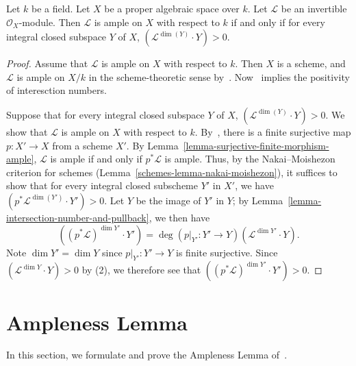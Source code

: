 \begin{lemma}
\label{spaces-lemma-nakai-moishezon}
Let $k$ be a field.
Let $X$ be a proper algebraic space over $k$.
Let $\mathcal{L}$ be an invertible $\mathcal{O}_X$-module.
Then $\mathcal{L}$ is ample on $X$ with respect to $k$ if and only if
for every integral closed subspace $Y$ of $X$,
$(\mathcal{L}^{\dim(Y)} \cdot Y) > 0$.
\end{lemma}
\begin{proof}
  Assume that $\mathcal{L}$ is ample on $X$ with respect to $k$.
  Then $X$ is a scheme, and $\mathcal{L}$ is ample on $X/k$ in the
  scheme-theoretic sense by~.
  Now~ implies the positivity of interesction numbers.

  Suppose that for every integral closed subspace $Y$ of $X$,
  $(\mathcal{L}^{\dim(Y)} \cdot Y) > 0$.
  We show that $\mathcal{L}$ is ample on $X$ with respect to $k$.
  By~, there is a finite surjective map $p : X' \to X$ from a
  scheme $X'$.
  By Lemma~\ref{lemma-surjective-finite-morphism-ample}, $\mathcal{L}$ is
  ample if and only if $p^*\mathcal{L}$ is ample.
  Thus, by the Nakai--Moishezon criterion for schemes
  (Lemma~\ref{schemes-lemma-nakai-moishezon}),
  it suffices to show that for every integral closed subscheme $Y'$ in $X'$, we
  have $(p^*\mathcal{L}^{\dim(Y')} \cdot Y') > 0$.
  Let $Y$ be the image of $Y'$ in $Y$;
  by Lemma~\ref{lemma-intersection-number-and-pullback}, we then have
  $$
  ( (p^*\mathcal{L})^{\dim Y'} \cdot Y') = \deg(p\rvert_{Y'} : Y' \to
  Y)(\mathcal{L}^{\dim Y'} \cdot Y).
  $$
  Note $\dim Y' = \dim Y$ since $p\rvert_{Y'} : Y' \to Y$ is finite surjective.
  Since $(\mathcal{L}^{\dim Y} \cdot Y) > 0$ by (2), we therefore see that
  $( (p^*\mathcal{L})^{\dim Y'} \cdot Y') > 0$.
\end{proof}

\section{Ampleness Lemma}
In this section, we formulate and prove the Ampleness Lemma
of~\cite[Lemmas 3.9 and 3.13]{ko90}.

